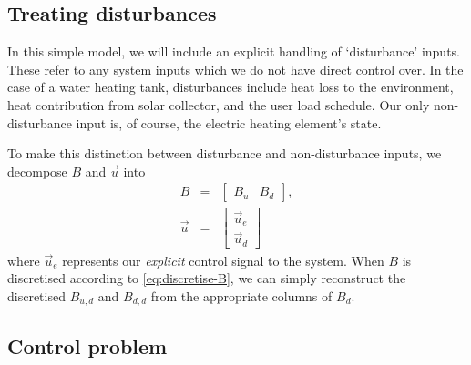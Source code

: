 \subsection{Treating disturbances}

In this simple model, we will include an explicit handling of `disturbance' inputs.
These refer to any system inputs which we do not have direct control over.
In the case of a water heating tank, disturbances include heat loss to the environment, heat contribution from solar collector, and the user load schedule.
Our only non-disturbance input is, of course, the electric heating element's state.

To make this distinction between disturbance and non-disturbance inputs, we decompose $B$ and $\vec{u}$ into
\begin{eqnarray}
   B &=& \left[\begin{array}{cc}
      B_u & B_d
   \end{array}\right], \\
   \vec{u} &=& \left[\begin{array}{c}
      \vec{u}_e \\ \vec{u}_d
   \end{array}\right]
\end{eqnarray}
where $\vec{u}_e$ represents our \emph{explicit} control signal to the system.
When $B$ is discretised according to \autoref{eq:discretise-B}, we can simply reconstruct the discretised $B_{u, d}$ and $B_{d, d}$ from the appropriate columns of $B_d$.

\subsection{Control problem}

